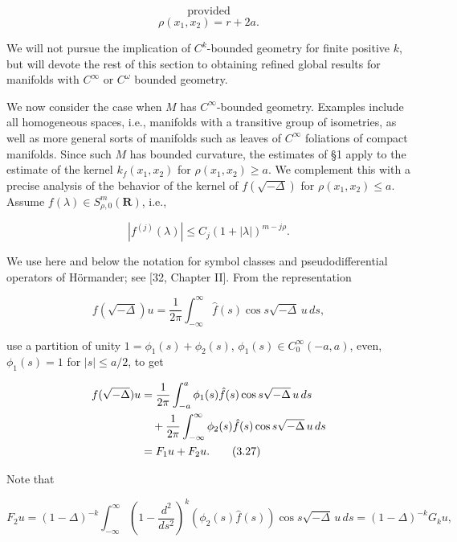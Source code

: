 \[
\text{provided}
\]
\begin{equation}\tag{3.24}
\rho(x_1,x_2)=r+2a.
\end{equation}

We will not pursue the implication of $C^k$-bounded geometry for finite positive $k$, but will devote the rest of this section to obtaining refined global results for manifolds with $C^\infty$ or $C^\omega$ bounded geometry.

We now consider the case when $M$ has $C^\infty$-bounded geometry. Examples include all homogeneous spaces, i.e., manifolds with a transitive group of isometries, as well as more general sorts of manifolds such as leaves of $C^\infty$ foliations of compact manifolds. Since such $M$ has bounded curvature, the estimates of \S1 apply to the estimate of the kernel $k_f(x_1,x_2)$ for $\rho(x_1,x_2)\ge a$. We complement this with a precise analysis of the behavior of the kernel of $f(\sqrt{-\Delta})$ for $\rho(x_1,x_2)\le a$. Assume $f(\lambda)\in S_{\rho,0}^m(\mathbf{R})$, i.e.,

\begin{equation}\tag{3.25}
|f^{(j)}(\lambda)|\le C_j(1+|\lambda|)^{m-j\rho}.
\end{equation}

We use here and below the notation for symbol classes and pseudodifferential operators of H\"ormander; see [32, Chapter II]. From the representation

\begin{equation}\tag{3.26}
f(\sqrt{-\Delta})u=\frac{1}{2\pi}\int_{-\infty}^{\infty}\hat f(s)\cos s\sqrt{-\Delta}\,u\,ds,
\end{equation}

use a partition of unity $1=\phi_1(s)+\phi_2(s)$, $\phi_1(s)\in C_0^\infty(-a,a)$, even, $\phi_1(s)=1$ for $|s|\le a/2$, to get

\begin{align}
f(\sqrt{-\Delta})u
&=\frac{1}{2\pi}\int_{-a}^{a}\phi_1(s)\hat f(s)\cos s\sqrt{-\Delta}\,u\,ds \notag\\
&\quad +\frac{1}{2\pi}\int_{-\infty}^{\infty}\phi_2(s)\hat f(s)\cos s\sqrt{-\Delta}\,u\,ds \notag\\
&=F_1u+F_2u.
\tag{3.27}
\end{align}

Note that

\begin{equation}\tag{3.28}
F_2u=(1-\Delta)^{-k}\int_{-\infty}^{\infty}
\left(1-\frac{d^2}{ds^2}\right)^k(\phi_2(s)\hat f(s))\cos s\sqrt{-\Delta}\,u\,ds
=(1-\Delta)^{-k}G_ku,
\end{equation}

